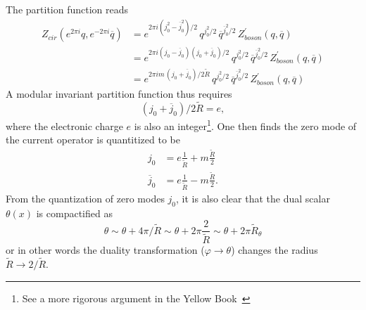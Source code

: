The partition function reads
\begin{equation}
	\begin{aligned}
		Z_{cir}(e^{2\pi i}q,e^{-2\pi i}\overline{q}) &= e^{2\pi i \left(j_0^2 - \overline{j}_0^2\right)/2} \, q^{j_0^2/2} \, \overline{q}^{\overline{j}_0^2/2} \, Z^{\prime}_{boson} (q,\overline{q}) \\
		&=e^{2\pi i \left(j_0 - \overline{j}_0\right) \left(j_0 + \overline{j}_0\right)/2} \, q^{j_0^2/2} \, \overline{q}^{\overline{j}_0^2/2} \, Z^{\prime}_{boson} (q,\overline{q}) \\
		&=e^{2\pi i m\, \left(j_0 + \overline{j}_0\right)/2\tilde{R}} \, q^{j_0^2/2} \, \overline{q}^{\overline{j}_0^2/2} \, Z^{\prime}_{boson} (q,\overline{q})
	\end{aligned}
\end{equation}
A modular invariant partition function thus requires 
\begin{equation}
	\left(j_0 + \overline{j}_0\right)/2\tilde{R} = e,
\end{equation}
where the electronic charge $e$ is also an integer\footnote{See a more rigorous argument in the Yellow Book~\cite{francesco2012conformal}}. One then finds the zero mode of the current operator is quantitized to be 
\begin{equation}
	\begin{aligned}
		j_0 &= e \frac{1}{\tilde{R}} + m \frac{\tilde{R}}{2} \\
		\overline{j}_0 &= e \frac{1}{\tilde{R}} - m \frac{\tilde{R}}{2}.
	\end{aligned}
\end{equation}
From the quantization of zero modes $j_0$, it is also clear that the dual scalar $\theta(x)$ is compactified as 
\begin{equation}
	\theta \sim \theta + 4\pi/\tilde{R} \sim \theta + 2\pi \frac{2}{\tilde{R}} \sim \theta + 2\pi \tilde{R}_\theta 
\end{equation}
or in other words the duality transformation ($\varphi \rightarrow  \theta$) changes the radius $\tilde{R} \rightarrow 2/\tilde{R}$.

